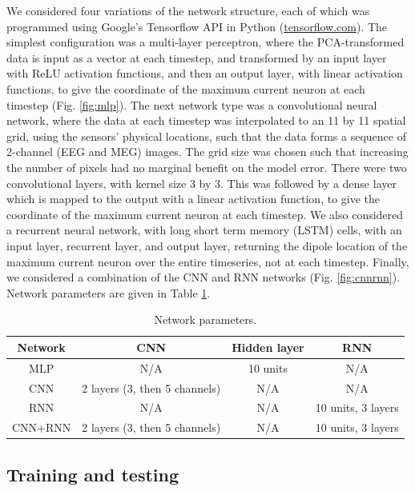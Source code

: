 \documentclass[journal]{IEEEtran}
\begin{document}
We considered four variations of the network structure, each of which was programmed using Google's Tensorflow API in Python (\url{tensorflow.com}). The simplest configuration was a multi-layer perceptron, where the PCA-transformed data is input as a vector at each timestep, and transformed by an input layer with ReLU activation functions, and then an output layer, with linear activation functions, to give the coordinate of the maximum current neuron at each timestep (Fig. \ref{fig:mlp}). The next network type was a convolutional neural network, where the data at each timestep was interpolated to an 11 by 11 spatial grid, using the sensors' physical locations, such that the data forms a sequence of 2-channel (EEG and MEG) images. The grid size was chosen such that increasing the number of pixels had no marginal benefit on the model error. There were two convolutional layers, with kernel size 3 by 3. This was followed by a dense layer which is mapped to the output with a linear activation function, to give the coordinate of the maximum current neuron at each timestep. We also considered a recurrent neural network, with long short term memory (LSTM) cells, with an input layer, recurrent layer, and output layer, returning the dipole location of the maximum current neuron over the entire timeseries, not at each timestep. Finally, we considered a combination of the CNN and RNN networks (Fig. \ref{fig:cnnrnn}). Network parameters are given in Table \ref{tab:params}. 

\begin{table}[h!]
  \centering
  \caption{Network parameters.}
  \begin{tabular}{c||c|c|c}
    \hline
    Network & CNN & Hidden layer & RNN\\
    \hline
    \hline
    MLP & N/A & 10 units & N/A \\
    \hline
    CNN & 2 layers (3, then 5 channels) & N/A & N/A \\
    \hline
    RNN & N/A & N/A & 10 units, 3 layers \\
    \hline
    CNN+RNN & 2 layers (3, then 5 channels) &  N/A & 10 units, 3 layers \\
  \end{tabular}
  \label{tab:params}
\end{table}


\subsection{Training and testing}
\end{document}
